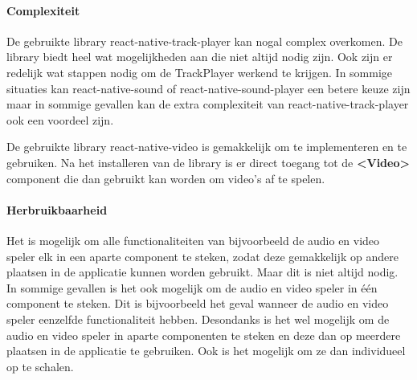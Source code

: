 \paragraph{Complexiteit}
De gebruikte library react-native-track-player kan nogal complex overkomen. De library 
biedt heel wat mogelijkheden aan die niet altijd nodig zijn. Ook zijn er redelijk wat stappen 
nodig om de TrackPlayer werkend te krijgen. In sommige situaties kan 
react-native-sound of react-native-sound-player een betere keuze zijn maar in sommige gevallen kan 
de extra complexiteit van react-native-track-player ook een voordeel zijn. 

De gebruikte library react-native-video is gemakkelijk om te implementeren en te gebruiken.
Na het installeren van de library is er direct toegang tot de \textbf{<Video>} component
die dan gebruikt kan worden om video's af te spelen.

\paragraph{Herbruikbaarheid}
Het is mogelijk om alle functionaliteiten van bijvoorbeeld de audio en video speler elk in een 
aparte component te steken, zodat deze gemakkelijk op andere plaatsen in de applicatie kunnen worden 
gebruikt. Maar dit is niet altijd
nodig. In sommige gevallen is het ook mogelijk om de audio en video speler in één component
te steken. Dit is bijvoorbeeld het geval wanneer de audio en video speler eenzelfde functionaliteit
hebben. Desondanks is het wel mogelijk om de audio en video speler in aparte componenten te steken
en deze dan op meerdere plaatsen in de applicatie te gebruiken. Ook is het mogelijk om ze dan 
individueel op te schalen.
